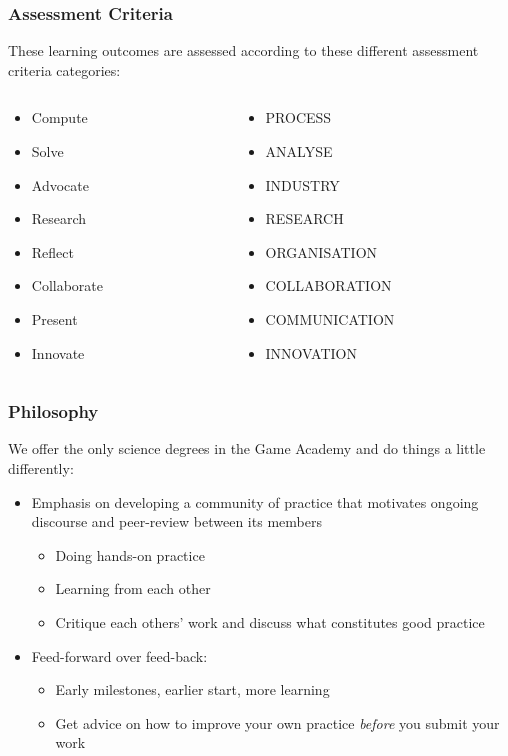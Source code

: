 \begin{frame}
	\frametitle{Assessment Criteria}
	
	These learning outcomes are assessed according to these different assessment criteria categories:
	
	\begin{columns}
		\begin{column}{0.5\textwidth}
			\begin{itemize}
				\item Compute
				\item Solve
				\item Advocate
				\item Research
				\item Reflect
				\item Collaborate
				\item Present
				\item Innovate
			\end{itemize}
		\end{column}
		\begin{column}{0.5\textwidth}
			\begin{itemize}
				\item PROCESS
				\item ANALYSE
				\item INDUSTRY
				\item RESEARCH
				\item ORGANISATION
				\item COLLABORATION
				\item COMMUNICATION
				\item INNOVATION
			\end{itemize}
		\end{column}
	\end{columns}
\end{frame}

\begin{frame}
	\frametitle{Philosophy}
	
	We offer the only science degrees in the Game Academy and do things a little differently:
	
	\begin{itemize}
		\pause\item Emphasis on developing a community of practice that motivates ongoing discourse and peer-review between its members
		\begin{itemize}
			\item Doing hands-on practice
			\item Learning from each other
			\item Critique each others' work and discuss what constitutes good practice
		\end{itemize}
		\pause\item Feed-forward over feed-back:
		\begin{itemize}
			\item Early milestones, earlier start, more learning
			\item Get advice on how to improve your own practice \textit{before} you submit your work
		\end{itemize}
	\end{itemize}
\end{frame}

